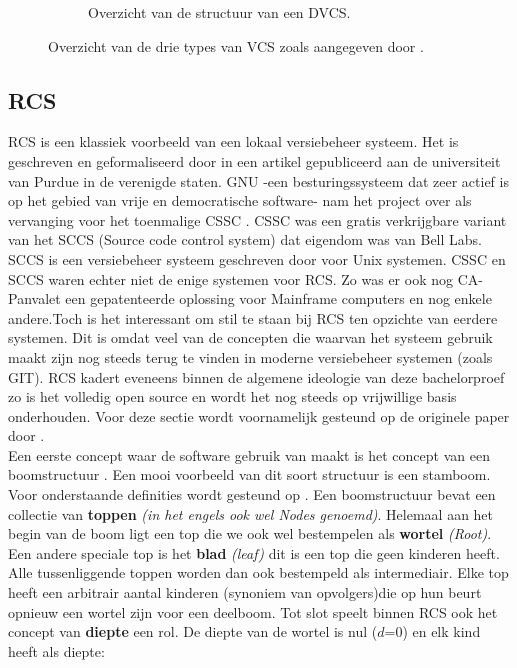 \begin{figure}[h!]
\begin{subfigure}{.5\textwidth}
	\caption[Overzicht structuur DVCS]{Overzicht van de structuur van een DVCS.}
	\end{subfigure}
	
	\caption[Overzicht types VCS]{Overzicht van de drie types van VCS zoals aangegeven door \textcite{Chacon2014}.}
	\label{fig:TypesVCS}
\end{figure}

	
\subsection{RCS}
\label{sec:RCS}
RCS is een klassiek voorbeeld van een lokaal versiebeheer systeem. Het is geschreven en geformaliseerd door \textcite{Tichy85rcs} in een artikel gepubliceerd aan de universiteit van Purdue in de verenigde staten. GNU -een besturingssysteem dat zeer actief is op het gebied van vrije en democratische software- nam het project over als vervanging voor het toenmalige CSSC \autocite{GNUCSSC}. CSSC was een gratis verkrijgbare variant van het SCCS (Source code control system) dat eigendom was van Bell Labs. SCCS is een versiebeheer systeem geschreven door \textcite{Rochkind1975} voor Unix systemen. CSSC en SCCS waren echter niet de enige systemen voor RCS. Zo was er ook nog CA-Panvalet een gepatenteerde oplossing voor Mainframe computers en nog enkele andere.Toch is het interessant om stil te staan bij RCS ten opzichte van eerdere systemen. Dit is omdat veel van de concepten die waarvan het systeem gebruik maakt zijn nog steeds terug te vinden in moderne versiebeheer systemen (zoals GIT). RCS kadert eveneens binnen de algemene ideologie van deze bachelorproef zo is het volledig open source en wordt het nog steeds op vrijwillige basis onderhouden. Voor deze sectie wordt voornamelijk gesteund op de originele paper door \textcite{Tichy85rcs}.\\

Een eerste concept waar de software gebruik van maakt is het concept van een boomstructuur . Een mooi voorbeeld van dit soort structuur is een stamboom. Voor onderstaande definities wordt gesteund op \textcite{Lievens2019}. Een boomstructuur bevat een collectie van \textbf{toppen} \textit{(in het engels ook wel Nodes genoemd)}. Helemaal aan het begin van de boom ligt een top die we ook wel bestempelen als \textbf{wortel} \textit{(Root)}. Een andere speciale top is het \textbf{blad} \textit{(leaf)} dit is een top die geen kinderen heeft. Alle tussenliggende toppen worden dan ook bestempeld als intermediair. Elke top heeft een arbitrair aantal kinderen (synoniem van opvolgers)die op hun beurt opnieuw een wortel zijn voor een deelboom. Tot slot speelt binnen RCS ook het concept van \textbf{diepte} een rol. De diepte van de wortel is nul ($d$=0) en elk kind heeft als diepte: 

